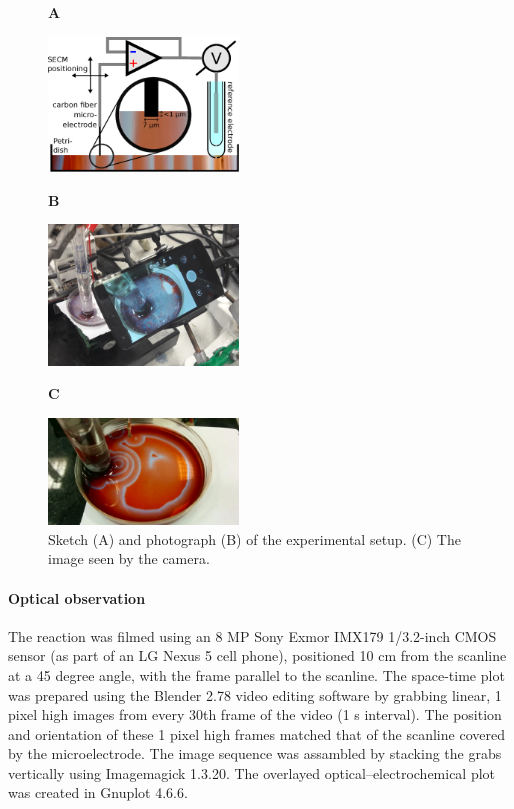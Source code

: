\documentclass[3p, twocolumn]{elsarticle}
\begin{document}
\begin{figure}
\centering
\begin{flushleft}
\textbf{A}
\end{flushleft}

\includegraphics[width=0.45\textwidth]{setup.eps}

\begin{flushleft}
\textbf{B}
\end{flushleft}

\includegraphics[width=0.45\textwidth]{setup_photo.jpg}

\begin{flushleft}
\textbf{C}
\end{flushleft}

\includegraphics[width=0.45\textwidth]{0.png}

\caption{
Sketch (A) and photograph (B) of the experimental setup. (C) The image seen by the camera.
}
\label{fig:setup}
\end{figure}

\paragraph{Optical observation}
The reaction was filmed using an 8 MP Sony Exmor IMX179 1/3.2-inch CMOS sensor (as part of an LG Nexus 5 cell phone), positioned 10 cm from the scanline at a 45 degree angle, with the frame parallel to the scanline.
The space-time plot was prepared using the Blender 2.78 video editing software by grabbing linear, 1 pixel high images from every 30th frame of the video (1 s interval).
The position and orientation of these 1 pixel high frames matched that of the scanline covered by the microelectrode.
The image sequence was assambled by stacking the grabs vertically using Imagemagick 1.3.20.
The overlayed optical--electrochemical plot was created in Gnuplot 4.6.6.
\end{document}
